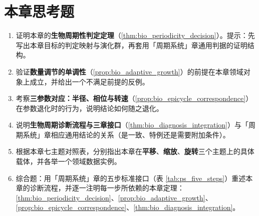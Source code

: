 \section*{本章思考题}

\begin{enumerate}[leftmargin=3em, label=\textbf{题 \arabic*}]
    \item 证明本章的\textbf{生物周期性判定定理}（\ref{thm:bio_periodicity_decision}）。提示：先写出本章目标的判定映射与演化群，再套用「周期系统」章通用判据的证明结构。

    \item 验证\textbf{数量调节的单调性}（\ref{prop:bio_adaptive_growth}）的前提在本章领域对象上成立，并给出一个不满足前提的反例。

    \item 考察\textbf{三参数对应：半径、相位与转速}（\ref{prop:bio_epicycle_correspondence}）在参数退化时的行为，说明结论如何随之退化。

    \item 说明\textbf{生物周期诊断流程与三章接口}（\ref{thm:bio_diagnosis_integration}）与「周期系统」章相应通用结论的关系（是一致、特例还是需要附加条件）。

    \item 根据本章七主题对照表，分别指出本章在\textbf{平移}、\textbf{缩放}、\textbf{旋转}三个主题上的具体载体，并各举一个领域数据实例。

    \item 综合题：用「周期系统」章的五步标准接口（表 \ref{tab:ps_five_steps}）重述本章的诊断流程，并逐一注明每一步所依赖的本章定理：\ref{thm:bio_periodicity_decision}、\ref{prop:bio_adaptive_growth}、\ref{prop:bio_epicycle_correspondence}、\ref{thm:bio_diagnosis_integration}。
\end{enumerate}


